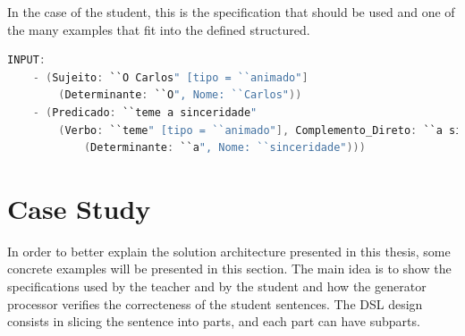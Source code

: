 
In the case of the student, this is the specification that should be used and one of the many examples that fit into the defined structured.

\begin{center}
\begin{minipage}{13cm}
\begin{lstlisting}[language=java, basicstyle=\tiny, label={lst:meta_input}, caption=Example of the students parsing]
INPUT:
    - (Sujeito: ``O Carlos" [tipo = ``animado"]
        (Determinante: ``O", Nome: ``Carlos"))
    - (Predicado: ``teme a sinceridade" 
        (Verbo: ``teme" [tipo = ``animado"], Complemento_Direto: ``a sinceridade" 
            (Determinante: ``a", Nome: ``sinceridade")))
\end{lstlisting}
\end{minipage}
\end{center}



\newpage
\section{Case Study}
In order to better explain the solution architecture presented in this thesis, some concrete examples will be presented in this section. The main idea is to show the 
specifications used by the teacher and by the student and how the generator processor verifies the correcteness of the student sentences. The DSL design consists in 
slicing the sentence into parts, and each part can have subparts.

